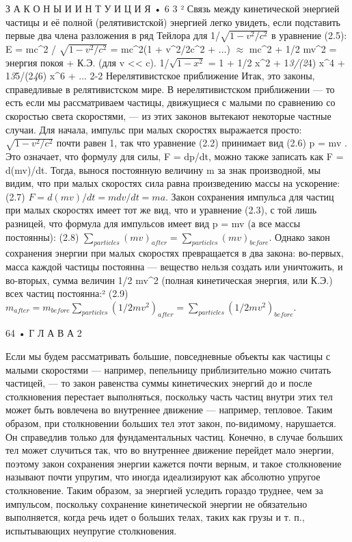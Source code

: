 \documentclass[10pt,oneside]{article}
\begin{document}
З А К О Н Ы  И  И Н Т У И Ц И Я • 6 3 ² Связь между кинетической энергией частицы и её полной (релятивистской) энергией легко увидеть, если подставить первые два члена разложения в ряд Тейлора для 1/\(\sqrt{1-v^2/c^2}\) в уравнение (2.5): E = mc\textasciicircum{}2 / \(\sqrt{1-v^2/c^2}\) = mc\textasciicircum{}2(1 + v\textasciicircum{}2/2c\textasciicircum{}2 + ...) \(\approx\) mc\textasciicircum{}2 + 1/2 mv\textasciicircum{}2 = энергия покоя + К.Э. (для v << c). 1/\(\sqrt{1-x^2}\) = 1 + 1/2 x\textasciicircum{}2 + 1\emph{3/(2}4) x\textasciicircum{}4 + 1\emph{3}5/(2\emph{4}6) x\textasciicircum{}6 + ... 2-2 Нерелятивистское приближение Итак, это законы, справедливые в релятивистском мире. В нерелятивистском приближении --- то есть если мы рассматриваем частицы, движущиеся с малыми по сравнению со скоростью света скоростями, --- из этих законов вытекают некоторые частные случаи. Для начала, импульс при малых скоростях выражается просто: \(\sqrt{1-v^2/c^2}\) почти равен 1, так что уравнение (2.2) принимает вид (2.6) p = mv . Это означает, что формулу для силы, F = dp/dt, можно также записать как F = d(mv)/dt. Тогда, вынося постоянную величину m за знак производной, мы видим, что при малых скоростях сила равна произведению массы на ускорение: (2.7) \(F = d(mv)/dt = m dv/dt = ma\). Закон сохранения импульса для частиц при малых скоростях имеет тот же вид, что и уравнение (2.3), с той лишь разницей, что формула для импульсов имеет вид p = mv (а все массы постоянны): (2.8) \(\sum_{particles} (mv)_{after} = \sum_{particles} (mv)_{before}\). Однако закон сохранения энергии при малых скоростях превращается в два закона: во-первых, масса каждой частицы постоянна --- вещество нельзя создать или уничтожить, и во-вторых, сумма величин 1/2 mv\textasciicircum{}2 (полная кинетическая энергия, или К.Э.) всех частиц постоянна:² (2.9) \(m_{after} = m_{before} \sum_{particles} (1/2 mv^2)_{after} = \sum_{particles} (1/2 mv^2)_{before}\).\par

64 • Г Л А В А  2\par

Если мы будем рассматривать большие, повседневные объекты как частицы с малыми скоростями --- например, пепельницу приблизительно можно считать частицей, --- то закон равенства суммы кинетических энергий до и после столкновения перестает выполняться, поскольку часть частиц внутри этих тел может быть вовлечена во внутреннее движение --- например, тепловое. Таким образом, при столкновении больших тел этот закон, по-видимому, нарушается. Он справедлив только для фундаментальных частиц. Конечно, в случае больших тел может случиться так, что во внутреннее движение перейдет мало энергии, поэтому закон сохранения энергии кажется почти верным, и такое столкновение называют почти упругим, что иногда идеализируют как абсолютно упругое столкновение. Таким образом, за энергией уследить гораздо труднее, чем за импульсом, поскольку сохранение кинетической энергии не обязательно выполняется, когда речь идет о больших телах, таких как грузы и т. п., испытывающих неупругие столкновения.\par
\end{document}
